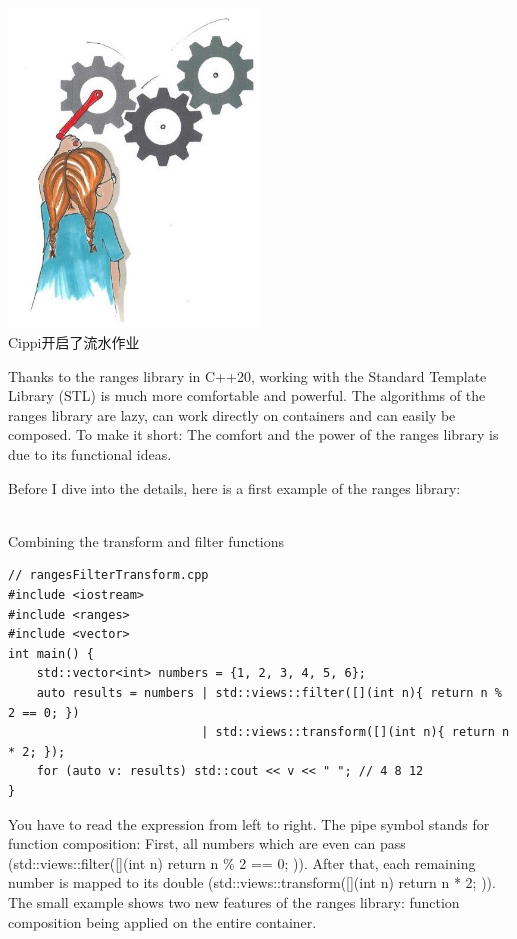 \begin{center}
\includegraphics[width=0.5\textwidth]{content/3/chapter5/images/2.png}\\
Cippi开启了流水作业
\end{center}

Thanks to the ranges library in C++20, working with the Standard Template Library (STL) is much more comfortable and powerful. The algorithms of the ranges library are lazy, can work directly on containers and can easily be composed. To make it short: The comfort and the power of the ranges library is due to its functional ideas.

Before I dive into the details, here is a first example of the ranges library:

\hspace*{\fill} \\ %
\noindent
Combining the transform and filter functions
\begin{lstlisting}[style=styleCXX]
// rangesFilterTransform.cpp
#include <iostream>
#include <ranges>
#include <vector>
int main() {
	std::vector<int> numbers = {1, 2, 3, 4, 5, 6};
	auto results = numbers | std::views::filter([](int n){ return n % 2 == 0; })
						   | std::views::transform([](int n){ return n * 2; });
	for (auto v: results) std::cout << v << " "; // 4 8 12
}
\end{lstlisting}

You have to read the expression from left to right. The pipe symbol stands for function composition: First, all numbers which are even can pass (std::views::filter([](int n){ return n \% 2 == 0; })). After that, each remaining number is mapped to its double (std::views::transform([](int n){ return n * 2; })). The small example shows two new features of the ranges library: function composition being applied on the entire container.

